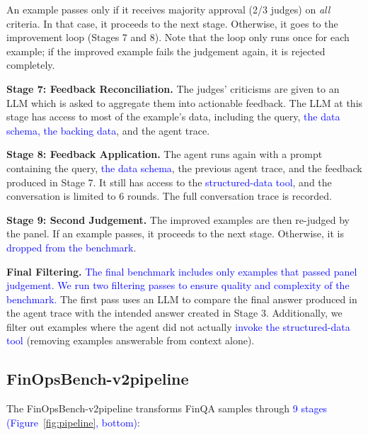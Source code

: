 \documentclass[11pt]{article}
\newcommand{\edit}[1]{\textcolor{blue}{#1}}
\newcommand{\editN}[1]{\textcolor{editgreen}{#1}}
\newcommand{\groundedfinqa}{FinOpsBench-v2}\xspace
\begin{document}
An example passes only if it receives majority approval (2/3 judges) on \emph{all} criteria. In that case, it proceeds to the next stage. Otherwise, it goes to the improvement loop (Stages 7 and 8). Note that the loop only runs once for each example; if the improved example fails the judgement again, it is rejected completely.

\noindent \textbf{Stage 7: Feedback Reconciliation.}
The judges' criticisms are given to an LLM which is asked to aggregate them into actionable feedback. The LLM at this stage has access to most of the example's data, including the query, \edit{the data schema, the backing data}, and the agent trace.

\noindent \textbf{Stage 8: Feedback Application.}
The agent runs again with a prompt containing the query, \edit{the data schema}, the previous agent trace, and the feedback produced in Stage 7.
It still has access to the \edit{structured-data tool}, and the conversation is limited to 6 rounds. The full conversation trace is recorded.

\noindent \textbf{Stage 9: Second Judgement.}
The improved examples are then re-judged by the 
\editN{panel}.
If an example passes, it proceeds to the next stage. Otherwise, it is \edit{dropped from the benchmark}.

\noindent \textbf{Final Filtering.}
\edit{The final benchmark includes only examples that passed 
\editN{panel}
judgement. We run two filtering passes to ensure quality and complexity of the benchmark.} The first pass uses an LLM to compare the final answer produced in the agent trace with the intended answer created in Stage 3. Additionally, we filter out examples where the agent did not actually \edit{invoke the structured-data tool} (removing examples answerable from context alone).

\subsection{\groundedfinqa pipeline}

The \groundedfinqa pipeline transforms FinQA samples through \edit{9 stages (Figure~\ref{fig:pipeline}, bottom)}:
\end{document}
